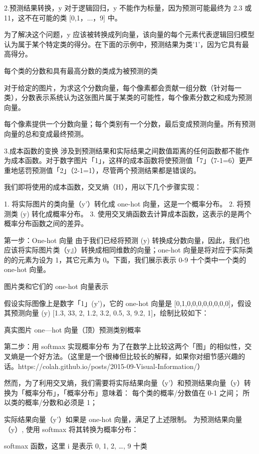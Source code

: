 \documentclass[11pt]{book} %
\begin{document}
2.预测结果转换，y
对于逻辑回归，y 不能作为标量，因为预测可能最终为 2.3 或 11，这不在可能的类 [0,1，...，9] 中。

为了解决这个问题，y 应该被转换成列向量，该向量的每个元素代表逻辑回归模型认为属于某个特定类的得分。在下面的示例中，预测结果为类'1'，因为它具有最高得分。


每个类的分数和具有最高分数的类成为被预测的类 

对于给定的图片，为求这个分数向量，每个像素都会贡献一组分数（针对每一类），分数表示系统认为这张图片属于某类的可能性，每个像素分数之和成为预测向量。


每个像素提供一个分数向量；每个类别有一个分数，最后变成预测向量。所有预测向量的总和变成最终预测。


3.成本函数的变换
涉及到预测结果和实际结果之间数值距离的任何函数都不能作为成本函数。对于数字图片「1」，这样的成本函数将使预测值「7」（7-1=6）更严重地惩罚预测值「2」（2-1=1），尽管两个预测结果都是错误的。

我们即将使用的成本函数，交叉熵（H），用以下几个步骤实现：

1. 将实际图片的类向量（y'）转化成 one-hot 向量，这是一个概率分布。
2. 将预测类 (y) 转化成概率分布。
3. 使用交叉熵函数去计算成本函数，这表示的是两个概率分布函数之间的差异。

第一步：One-hot 向量
由于我们已经将预测 (y) 转换成分数向量，因此，我们也应该将实际图片类（y』）转换成相同维数的向量；one-hot 向量是将对应于实际类的的元素为设为 1，其它元素为 0。下面，我们展示表示 0-9 十个类中一个类的 one-hot 向量。

图片类和它们的 one-hot 向量表示 

假设实际图像上是数字「1」(y')，它的 one-hot 向量是 [0,1,0,0,0,0,0,0,0,0]，假设其预测向量 (y) [1.3, 33, 2, 1.2, 3.2, 0.5, 3, 9.2, 1]，绘制比较如下：

真实图片 one—hot 向量（顶）预测类别概率 

第二步：用 softmax 实现概率分布
为了在数学上比较这两个「图」的相似性，交叉熵是一个好方法。（这里是一个很棒但比较长的解释，如果你对细节感兴趣的话。https://colah.github.io/posts/2015-09-Visual-Information/）

然而，为了利用交叉熵，我们需要将实际结果向量（y'）和预测结果向量（y）转换为「概率分布」，「概率分布」意味着：
每个类的概率/分数值在 0-1 之间；
所以类的概率/分数和必须是 1；

实际结果向量（y'）如果是 one-hot 向量，满足了上述限制。
为预测结果向量（y）, 使用 softmax 将其转换为概率分布：

softmax 函数，这里 i 是表示 0, 1, 2, …, 9 十类
\end{document}
